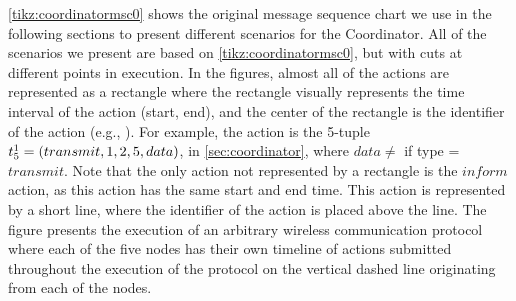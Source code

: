 \autoref{tikz:coordinatormsc0} shows the original message sequence chart we use in the following sections to present different scenarios for the Coordinator. All of the scenarios we present are based on \autoref{tikz:coordinatormsc0}, but with cuts at different points in execution. In the figures, almost all of the actions are represented as a rectangle where the rectangle visually represents the time interval of the action (start, end), and the center of the rectangle is the identifier of the action (e.g., ). For example, the action  is the 5-tuple $t^{1}_{5} = (transmit, 1, 2, 5, data)$, in \autoref{sec:coordinator}, where $data \neq$ \KwNull if type = $transmit$. Note that the only action not represented by a rectangle is the $inform$ action, as this action has the same start and end time. This action is represented by a short line, where the identifier of the action is placed above the line. The figure presents the execution of an arbitrary wireless communication protocol where each of the five nodes has their own timeline of actions submitted throughout the execution of the protocol on the vertical dashed line originating from each of the nodes. \medbreak

